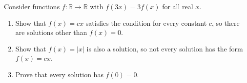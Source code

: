 Consider functions $f:\mathbb R\to\mathbb R$ with $f(3x)=3f(x)$ for all real $x$.
\begin{enumerate}
\item[(a)] Show that $f(x)=cx$ satisfies the condition for every constant $c$, so there are solutions other than $f(x)=0$.
\item[(b)] Show that $f(x)=|x|$ is also a solution, so not every solution has the form $f(x)=cx$.
\item[(c)] Prove that every solution has $f(0)=0$.
\end{enumerate}
